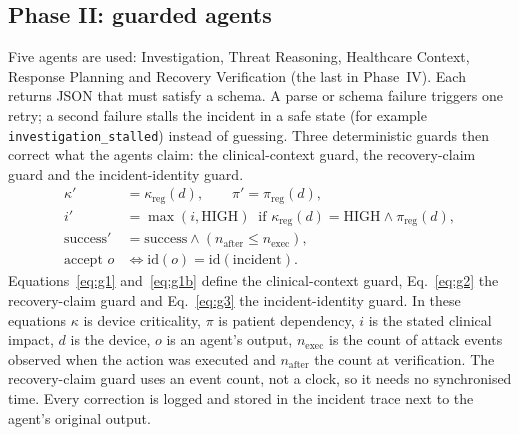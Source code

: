 \documentclass[preprint,12pt]{elsarticle}
\begin{document}
\subsection{Phase II: guarded agents}
Five agents are used: Investigation, Threat Reasoning, Healthcare Context, Response Planning and Recovery Verification (the last in Phase~IV). Each returns JSON that must satisfy a schema. A parse or schema failure triggers one retry; a second failure stalls the incident in a safe state (for example \texttt{investigation\_stalled}) instead of guessing. Three deterministic guards then correct what the agents claim: the clinical-context guard, the recovery-claim guard and the incident-identity guard.
\begin{align}
\kappa' &= \kappa_{\mathrm{reg}}(d), \qquad \pi' = \pi_{\mathrm{reg}}(d), \label{eq:g1}\\
i' &= \max(i,\mathrm{HIGH}) \ \text{ if } \kappa_{\mathrm{reg}}(d)=\mathrm{HIGH}\wedge \pi_{\mathrm{reg}}(d), \label{eq:g1b}\\
\mathrm{success}' &= \mathrm{success}\wedge (n_{\mathrm{after}}\le n_{\mathrm{exec}}), \label{eq:g2}\\
\text{accept } o &\iff \mathrm{id}(o)=\mathrm{id}(\text{incident}). \label{eq:g3}
\end{align}
Equations~\eqref{eq:g1} and~\eqref{eq:g1b} define the clinical-context guard, Eq.~\eqref{eq:g2} the recovery-claim guard and Eq.~\eqref{eq:g3} the incident-identity guard.
In these equations $\kappa$ is device criticality, $\pi$ is patient dependency, $i$ is the stated clinical impact, $d$ is the device, $o$ is an agent's output, $n_{\mathrm{exec}}$ is the count of attack events observed when the action was executed and $n_{\mathrm{after}}$ the count at verification. The recovery-claim guard uses an event count, not a clock, so it needs no synchronised time. Every correction is logged and stored in the incident trace next to the agent's original output.
\end{document}
